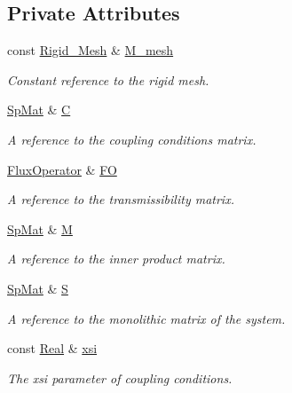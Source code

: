 \subsection*{Private Attributes}
\begin{DoxyCompactItemize}
\item 
const \hyperlink{classFVCode3D_1_1Rigid__Mesh}{Rigid\+\_\+\+Mesh} \& \hyperlink{classFVCode3D_1_1FractureBuilder_a1d94459249cc414f162853509755fa3a}{M\+\_\+mesh}
\begin{DoxyCompactList}\small\item\em Constant reference to the rigid mesh. \end{DoxyCompactList}\item 
\hyperlink{namespaceFVCode3D_ac1032289d96638cf0ad6c52ef639095f}{Sp\+Mat} \& \hyperlink{classFVCode3D_1_1FractureBuilder_a8fd06afa6c18949cfdb034db10775ace}{C}
\begin{DoxyCompactList}\small\item\em A reference to the coupling conditions matrix. \end{DoxyCompactList}\item 
\hyperlink{classFVCode3D_1_1FluxOperator}{Flux\+Operator} \& \hyperlink{classFVCode3D_1_1FractureBuilder_aa9979563fab859667fc6fc242d6e461c}{FO}
\begin{DoxyCompactList}\small\item\em A reference to the transmissibility matrix. \end{DoxyCompactList}\item 
\hyperlink{namespaceFVCode3D_ac1032289d96638cf0ad6c52ef639095f}{Sp\+Mat} \& \hyperlink{classFVCode3D_1_1FractureBuilder_a24d025a1ca7ca61edeec47be5b049a52}{M}
\begin{DoxyCompactList}\small\item\em A reference to the inner product matrix. \end{DoxyCompactList}\item 
\hyperlink{namespaceFVCode3D_ac1032289d96638cf0ad6c52ef639095f}{Sp\+Mat} \& \hyperlink{classFVCode3D_1_1FractureBuilder_a4863fe7c2507df5d6f30dbdac2a27c31}{S}
\begin{DoxyCompactList}\small\item\em A reference to the monolithic matrix of the system. \end{DoxyCompactList}\item 
const \hyperlink{namespaceFVCode3D_a40c1f5588a248569d80aa5f867080e83}{Real} \& \hyperlink{classFVCode3D_1_1FractureBuilder_add8696ef08b9dad08e62a0ef85a437b4}{xsi}
\begin{DoxyCompactList}\small\item\em The xsi parameter of coupling conditions. \end{DoxyCompactList}\end{DoxyCompactItemize}



